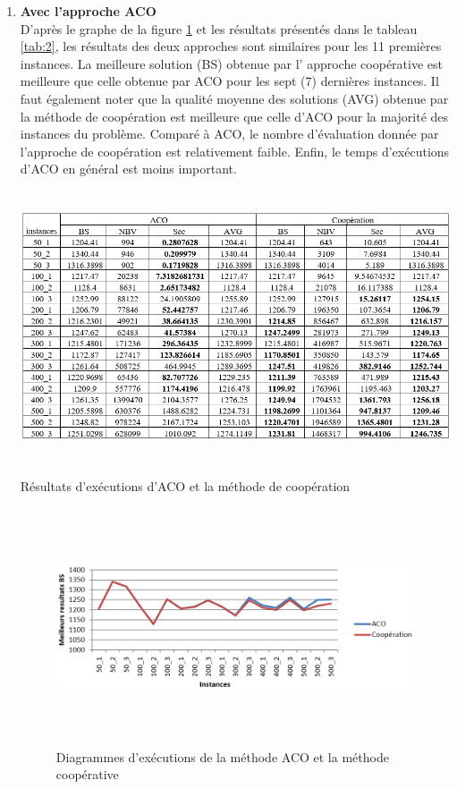 \begin{enumerate}[label=\alph*)]
	\item \textbf{Avec l’approche ACO}\\
	D’après le graphe de la figure \ref{fig:DEMACOMC} et les résultats présentés dans le tableau \ref{tab:2}, les résultats des deux approches sont similaires pour les 11 premières instances. La meilleure solution (BS) obtenue par l’ approche coopérative  est meilleure que celle obtenue par ACO pour les sept  (7) dernières instances. Il faut également noter que la qualité moyenne des solutions (AVG) obtenue par la méthode de coopération est  meilleure que celle d’ACO pour la majorité des instances du problème. Comparé à ACO, le nombre d’évaluation donnée par  l’approche de coopération est relativement faible. Enfin,  le temps d’exécutions  d'ACO en général est moins important.

\begin{table}[H]
	\includegraphics[width=15cm,height=8cm]{Chap5/t2.png}
	\caption{Résultats d’exécutions d’ACO et la méthode de coopération}
	\label{tab:2}
\end{table}

\begin{figure}[H]
	\centering
	\includegraphics[width=16cm,height=7cm]{Chap5/2.png}
	\caption{Diagrammes d’exécutions de la méthode ACO et la méthode coopérative}
	\label{fig:DEMACOMC}
\end{figure}


\end{enumerate}
